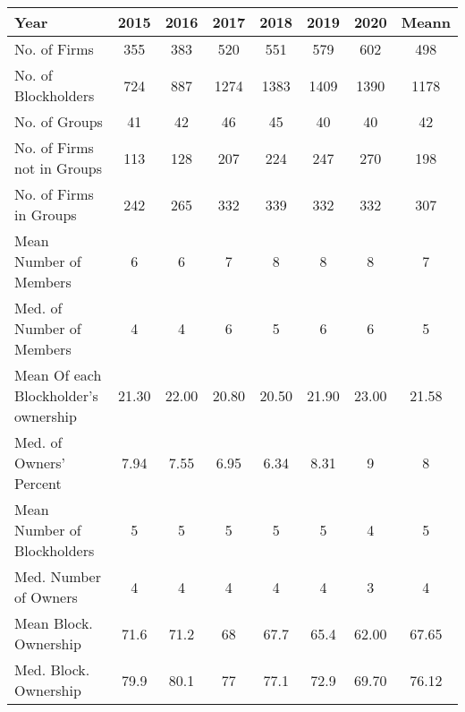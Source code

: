   \begin{tabular}{lccccccc}
          \hline\hline
          Year  & \multicolumn{1}{c}{2015} & \multicolumn{1}{c}{2016} & \multicolumn{1}{c}{2017} & \multicolumn{1}{c}{2018} & \multicolumn{1}{c}{2019} & \multicolumn{1}{c}{2020} & Meann \\\hline
     No. of Firms & 355   & 383   & 520   & 551   & 579   & 602   & 498 \\
     No. of Blockholders & 724   & 887   & 1274  & 1383  & 1409  & 1390  & 1178 \\
     No. of Groups & 41    & 42    & 46    & 45    & 40    & 40    & 42 \\
     No. of Firms not in Groups & 113   & 128   & 207   & 224   & 247   & 270   & 198 \\
     No. of Firms in Groups & 242   & 265   & 332   & 339   & 332   & 332   & 307 \\
     Mean Number of Members & 6     & 6     & 7     & 8     & 8     & 8     & 7 \\
     Med. of Number of Members & 4     & 4     & 6     & 5     & 6     & 6     & 5 \\
     Mean Of each Blockholder's ownership & 21.30 & 22.00 & 20.80 & 20.50 & 21.90 & 23.00 & 21.58 \\
     Med. of Owners' Percent & 7.94  & 7.55  & 6.95  & 6.34  & 8.31  & 9     & 8 \\
     Mean Number of Blockholders & 5     & 5     & 5     & 5     & 5     & 4     & 5 \\
     Med. Number of Owners & 4     & 4     & 4     & 4     & 4     & 3     & 4 \\
     Mean Block. Ownership & 71.6  & 71.2  & 68    & 67.7  & 65.4  & 62.00 & 67.65 \\
     Med. Block. Ownership & 79.9  & 80.1  & 77    & 77.1  & 72.9  & 69.70 & 76.12 \\
          \hline\hline 
    
          \end{tabular}
         